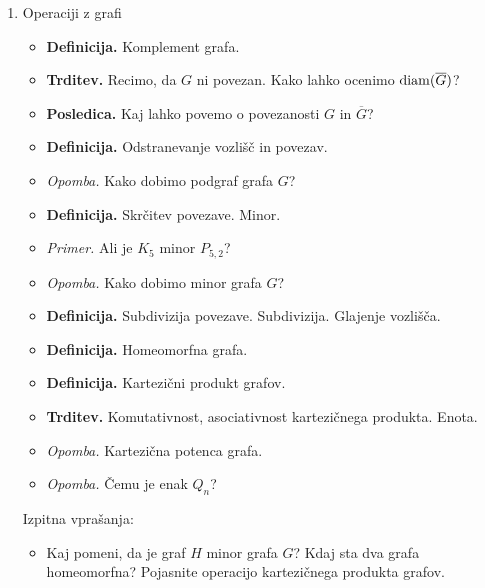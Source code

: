 \begin{enumerate}
    \item Operaciji z grafi
    \begin{itemize}
        \item \colorbox{purple!30}{\textbf{Definicija.}} Komplement grafa.
        \item \colorbox{blue!30}{\textbf{Trditev.}} Recimo, da \(G\) ni povezan. Kako lahko ocenimo \(\operatorname{diam} (\overline{G})\)?
        \item \colorbox{orange!30}{\textbf{Posledica.}} Kaj lahko povemo o povezanosti \(G\) in \(\overline{G}\)?
        \item \colorbox{purple!30}{\textbf{Definicija.}} Odstranevanje vozlišč in povezav.
        \item \colorbox{yellow!30}{\emph{Opomba.}} Kako dobimo podgraf grafa \(G\)?
        \item \colorbox{purple!30}{\textbf{Definicija.}} Skrčitev povezave. Minor.
        \item \colorbox{yellow!30}{\emph{Primer.}} Ali je \(K_5\) minor \(P_{5,2}\)?
        \item \colorbox{yellow!30}{\emph{Opomba.}} Kako dobimo minor grafa \(G\)?
        \item \colorbox{purple!30}{\textbf{Definicija.}} Subdivizija povezave. Subdivizija. Glajenje vozlišča.
        \item \colorbox{purple!30}{\textbf{Definicija.}} Homeomorfna grafa.
        \item \colorbox{purple!30}{\textbf{Definicija.}} Kartezični produkt grafov.
        \item \colorbox{blue!30}{\textbf{Trditev.}} Komutativnost, asociativnost kartezičnega produkta. Enota. 
        \item \colorbox{yellow!30}{\emph{Opomba.}} Kartezična potenca grafa.
        \item \colorbox{yellow!30}{\emph{Opomba.}} Čemu je enak \(Q_n\)?
    \end{itemize}

    Izpitna vprašanja:
    \begin{itemize}
        \item Kaj pomeni, da je graf \(H\) minor grafa \(G\)? Kdaj sta dva grafa homeomorfna? Pojasnite operacijo kartezičnega produkta grafov.
    \end{itemize}  


\end{enumerate}
